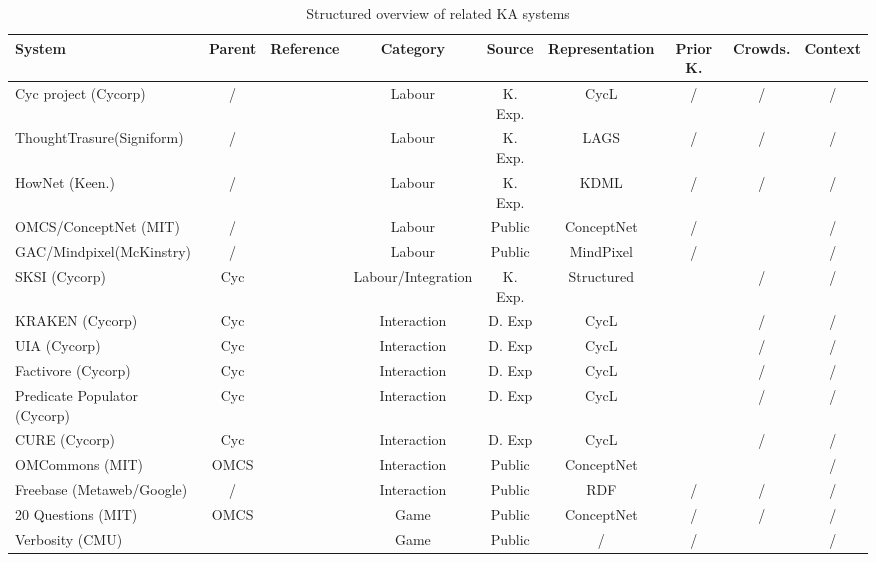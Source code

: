 \begin{landscape}
	\begin{table}[htb]
	\caption{Structured overview of related KA systems}
	\label{tab:related}
	\centering
	\begin{adjustbox}{width=1.4\textwidth}
	\begin{tabular}{lclcccccc}
		\hline
		System & Parent & Reference & Category & Source & Representation & Prior K. &  Crowds. & Context \\
		\hline
		Cyc project (Cycorp) & / & \parencite{Lenat1995} & Labour & K. Exp. & CycL & / & / & / \\
		ThoughtTrasure(Signiform) & / & \parencite{Mueller2003} & Labour & K. Exp. & LAGS & / & / & / \\
		HowNet (Keen.) & / & \parencite{Dong2010} & Labour & K. Exp. & KDML & / & / & / \\
		OMCS/ConceptNet (MIT) & / & \parencite{Singh2002a} & Labour & Public & ConceptNet & / & \checkmark & / \\
		GAC/Mindpixel(McKinstry) & / & \parencite{McKinstry2008} & Labour & Public & MindPixel & / & \checkmark & / \\
	    SKSI (Cycorp) & Cyc & \parencite{Masters2007} & Labour/Integration & K. Exp. &  Structured & \checkmark & / & / \\
		KRAKEN (Cycorp) & Cyc & \parencite{Panton2002a} & Interaction & D. Exp & CycL & \checkmark & / & / \\
		UIA (Cycorp) & Cyc & \parencite{Witbrock2003UIA} & Interaction & D. Exp & CycL & \checkmark & / & / \\
		Factivore (Cycorp) & Cyc & \parencite{Witbrock2005} & Interaction & D. Exp & CycL & \checkmark & / & / \\
		Predicate Populator (Cycorp) & Cyc & \parencite{Witbrock2005} & Interaction & D. Exp & CycL & \checkmark & / & / \\
		CURE (Cycorp) & Cyc & \parencite{Witbrock2010} & Interaction & D. Exp & CycL & \checkmark & / & / \\
		OMCommons (MIT) & OMCS & \parencite{Speer2007} & Interaction & Public & ConceptNet & \checkmark & \checkmark & / \\
		Freebase (Metaweb/Google) & / & \parencite{Bollacker2008} & Interaction & Public & RDF & / & / & / \\
		20 Questions (MIT) & OMCS & \parencite{Speer2009} & Game & Public & ConceptNet & / & / & / \\
		Verbosity (CMU) &   & \parencite{VonAhn2006a}  & Game & Public & /  & /  & \checkmark  & /  \\

\end{tabular}
\end{adjustbox}
\end{table}
\end{landscape}
